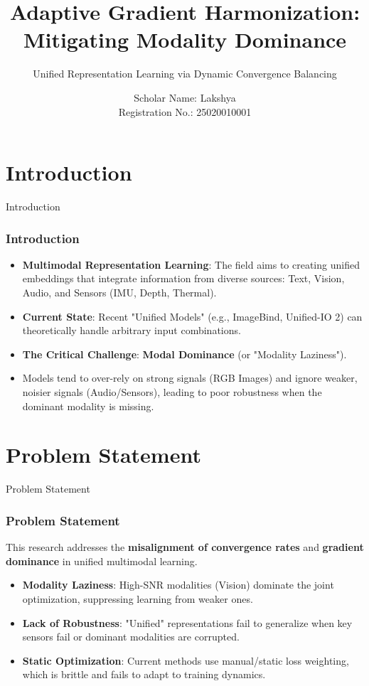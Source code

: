 \documentclass[serif, aspectratio=169]{beamer}
\author{Scholar Name: Lakshya \texorpdfstring{\\}{, }Registration No.: 25020010001}
\title{Adaptive Gradient Harmonization: Mitigating Modality Dominance}
\subtitle{Unified Representation Learning via Dynamic Convergence Balancing}
\institute{
    Supervisor:  Prof (Dr.) Sandeep Joshi, Department of CSE\\

	\textbf{Faculty of Science, Technology and Architecture} \\ 
	\textbf{School of CSE, Department of CSE}\\
	\textbf{Manipal University Jaipur, Rajasthan, India} \\ \vspace{5mm}
	\textbf{January 2026}
}
\begin{document}
\justify
	\begin{frame}
		\titlepage
	\end{frame}
	
	\begin{frame}    
		\tableofcontents[sectionstyle=show,
		subsectionstyle=show/shaded/hide,
		subsubsectionstyle=show/shaded/hide]
	\end{frame}

\section{Introduction}
\begin{frame}{Introduction}
    \frametitle<presentation>{Introduction}
    \begin{itemize}
        \item \justifying \textbf{Multimodal Representation Learning}: The field aims to creating unified embeddings that integrate information from diverse sources: Text, Vision, Audio, and Sensors (IMU, Depth, Thermal).
        \item \justifying \textbf{Current State}: Recent "Unified Models" (e.g., ImageBind, Unified-IO 2) can theoretically handle arbitrary input combinations.
        \item \justifying \textbf{The Critical Challenge}: \textbf{Modal Dominance} (or "Modality Laziness").
        \item \justifying Models tend to over-rely on strong signals (RGB Images) and ignore weaker, noisier signals (Audio/Sensors), leading to poor robustness when the dominant modality is missing.
    \end{itemize}
\end{frame}

\section{Problem Statement}
\begin{frame}{Problem Statement}
    \frametitle<presentation>{Problem Statement}
    This research addresses the \textbf{misalignment of convergence rates} and \textbf{gradient dominance} in unified multimodal learning.
    \vspace{0.5cm}
    \begin{itemize}
        \item \textbf{Modality Laziness}: High-SNR modalities (Vision) dominate the joint optimization, suppressing learning from weaker ones.
        \item \textbf{Lack of Robustness}: "Unified" representations fail to generalize when key sensors fail or dominant modalities are corrupted.
        \item \textbf{Static Optimization}: Current methods use manual/static loss weighting, which is brittle and fails to adapt to training dynamics.
    \end{itemize}
\end{frame}
\end{document}
